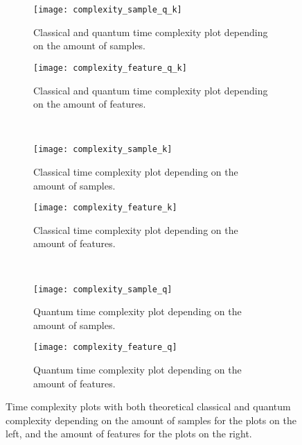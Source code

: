 \documentclass[conference]{IEEEtran}
\begin{document}
\begin{figure*}
     \centering
     \begin{subfigure}[h]{0.45\textwidth}
         \centering
         \texttt{[image: complexity\_sample\_q\_k]}
         \caption{Classical and quantum time complexity plot depending on the amount of samples.}
         \label{fig:complexity_sample_q_k}
     \end{subfigure}
     \hfill
     \begin{subfigure}[h]{0.45\textwidth}
         \centering
         \texttt{[image: complexity\_feature\_q\_k]}
         \caption{Classical and quantum time complexity plot depending on the amount of features.}
         \label{fig:complexity_feature_q_k}
     \end{subfigure}
     \hfill \\
     \begin{subfigure}[h]{0.45\textwidth}
         \centering
         \texttt{[image: complexity\_sample\_k]}
         \caption{Classical time complexity plot depending on the amount of samples.}
         \label{fig:complexity_sample_k}
     \end{subfigure}
     \hfill
     \begin{subfigure}[h]{0.45\textwidth}
         \centering
         \texttt{[image: complexity\_feature\_k]}
         \caption{Classical time complexity plot depending on the amount of features.}
         \label{fig:complexity_feature_k}
     \end{subfigure}
     \hfill \\
     \begin{subfigure}[h]{0.45\textwidth}
         \centering
         \texttt{[image: complexity\_sample\_q]}
         \caption{Quantum time complexity plot depending on the amount of samples.}
         \label{fig:complexity_sample_q}
     \end{subfigure}
     \hfill
     \begin{subfigure}[h]{0.45\textwidth}
         \centering
         \texttt{[image: complexity\_feature\_q]}
         \caption{Quantum time complexity plot depending on the amount of features.}
         \label{fig:complexity_feature_q}
     \end{subfigure}
        \caption{Time complexity plots with both theoretical classical and quantum complexity depending on the amount of samples for the plots on the left, and the amount of features for the plots on the right.}
        \label{fig:complexity}
\end{figure*}
\end{document}
